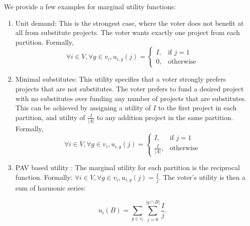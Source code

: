 \documentclass[runningheads]{llncs}
\begin{document}
We provide a few examples for  marginal utility functions:
\begin{enumerate}
    \item Unit demand: This is the strongest case, where   the voter does not benefit at all from substitute projects. The voter wants exactly one project from each partition. Formally, $$\forall i\in V, \forall g\in v_i, u_{i,g}(j)= 
        \begin{cases}
            I             ,& \text{if } j=1\\
            0,             & \text{otherwise}
        \end{cases}$$

    \item Minimal substitutes: This utility specifies that   a voter strongly prefers projects that are not substitutes.  The voter prefers to fund  a desired project with no substitutes   over funding any number of projects that are substitutes.
     This can be achieved by assigning  a utility of $I$ to the first project in each partition, and utility of $\frac{I}{|A|}$ to any addition project in the same partition. 
    Formally, $$\forall i\in V, \forall g\in v_i, u_{i,g}(j)= 
        \begin{cases}
            I                         ,& \text{if } j=1\\
            \frac{I}{|A|},             & \text{otherwise}
        \end{cases}$$
    
    \item PAV based utility \cite{thiele1895om}:  The marginal utility for each partition is the reciprocal function. Formally: $\forall i\in V, \forall g\in v_i, u_{i,g}(j)=\frac{I}{j}$. The voter's utility is then a sum of harmonic series: 
    
    $$u_i(B)=\sum_{g\in{v_i}}\sum_{j=0}^{|g\cap B|}\frac{I}{j}.$$
\end{enumerate}


\end{document}
